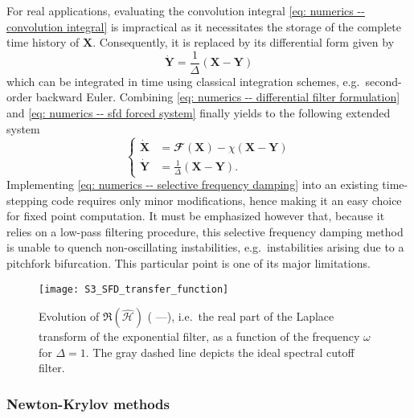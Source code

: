     For real applications, evaluating the convolution integral \eqref{eq: numerics -- convolution integral} is impractical as it necessitates the storage of the complete time history of $\mathbf{X}$. Consequently, it is replaced by its differential form given by
    \begin{equation}
      \dot{\mathbf{Y}} = \displaystyle \frac{1}{\Delta} \left( \mathbf{X} - \mathbf{Y} \right)
      \label{eq: numerics -- differential filter formulation}
    \end{equation}
    which can be integrated in time using classical integration schemes, e.g.\ second-order backward Euler. Combining \eqref{eq: numerics -- differential filter formulation} and \eqref{eq: numerics -- sfd forced system} finally yields to the following extended system
    \begin{equation}
      \left\{
      \begin{aligned}
        \dot{\mathbf{X}} & = \mathbfcal{F}\left( \mathbf{X} \right) - \chi \left( \mathbf{X} - \mathbf{Y} \right) \\
        \dot{\mathbf{Y}} & = \displaystyle \frac{1}{\Delta} \left( \mathbf{X} - \mathbf{Y} \right).
      \end{aligned}
      \right.
      \label{eq: numerics -- selective frequency damping}
    \end{equation}
    Implementing \eqref{eq: numerics -- selective frequency damping} into an existing time-stepping code requires only minor modifications, hence making it an easy choice for fixed point computation. It must be emphasized however that, because it relies on a low-pass filtering procedure, this selective frequency damping method is unable to quench non-oscillating instabilities, e.g.\ instabilities arising due to a pitchfork bifurcation. This particular point is one of its major limitations.

    \begin{figure}[b]
      \sidecaption
      \texttt{[image: S3\_SFD\_transfer\_function]}
      \caption{Evolution of $\Re \left( \hat{\mathcal{H}} \right)$ ({\color{blue} ---}), i.e.\ the real part of the Laplace transform of the exponential filter, as a function of the frequency $\omega$ for $\Delta=1$. The gray dashed line depicts the ideal spectral cutoff filter.}
      \label{fig: numerics -- lapalce transform}
    \end{figure}

    \subsubsection{Newton-Krylov methods}
    \label{subsubsec: numerics -- newton-krylov methods}


